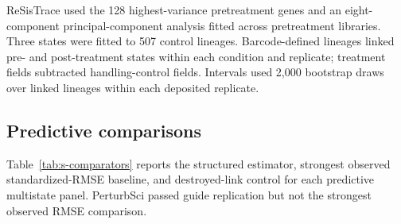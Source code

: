 \documentclass[10pt,a4paper]{article}
\begin{document}
ReSisTrace used the 128 highest-variance pretreatment genes and an eight-component principal-component analysis fitted across pretreatment libraries. Three states were fitted to 507 control lineages. Barcode-defined lineages linked pre- and post-treatment states within each condition and replicate; treatment fields subtracted handling-control fields. Intervals used 2,000 bootstrap draws over linked lineages within each deposited replicate.

\subsection{Predictive comparisons}

Table~\ref{tab:s-comparators} reports the structured estimator, strongest observed standardized-RMSE baseline, and destroyed-link control for each predictive multistate panel. PerturbSci passed guide replication but not the strongest observed RMSE comparison.
\end{document}
